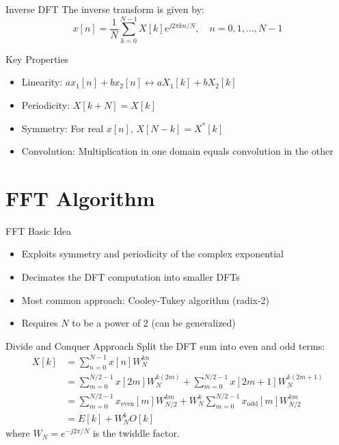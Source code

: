 \documentclass{beamer}
\begin{document}
\begin{frame}{Inverse DFT}
  The inverse transform is given by:
  \[ x[n] = \frac{1}{N} \sum_{k=0}^{N-1} X[k] e^{j 2\pi k n / N}, \quad n = 0,1,\ldots,N-1 \]
  \begin{block}{Key Properties}
    \begin{itemize}
    \item Linearity: $a x_1[n] + b x_2[n] \leftrightarrow a X_1[k] + b X_2[k]$
    \item Periodicity: $X[k+N] = X[k]$
    \item Symmetry: For real $x[n]$, $X[N-k] = X^*[k]$
    \item Convolution: Multiplication in one domain equals convolution in the other
    \end{itemize}
  \end{block}
\end{frame}

\section{FFT Algorithm}

\begin{frame}{FFT Basic Idea}
  \begin{itemize}
  \item Exploits symmetry and periodicity of the complex exponential
  \item Decimates the DFT computation into smaller DFTs
  \item Most common approach: Cooley-Tukey algorithm (radix-2)
  \item Requires $N$ to be a power of 2 (can be generalized)
  \end{itemize}
  \begin{center}
  \end{center}
\end{frame}

\begin{frame}{Divide and Conquer Approach}
  Split the DFT sum into even and odd terms:
  \begin{align*}
    X[k] &= \sum_{n=0}^{N-1} x[n] W_N^{kn} \\
    &= \sum_{m=0}^{N/2-1} x[2m] W_N^{k(2m)} + \sum_{m=0}^{N/2-1} x[2m+1] W_N^{k(2m+1)} \\
    &= \sum_{m=0}^{N/2-1} x_{\text{even}}[m] W_{N/2}^{km} + W_N^k \sum_{m=0}^{N/2-1} x_{\text{odd}}[m] W_{N/2}^{km} \\
    &= E[k] + W_N^k O[k]
  \end{align*}
  where $W_N = e^{-j 2\pi/N}$ is the twiddle factor.
\end{frame}
\end{document}
